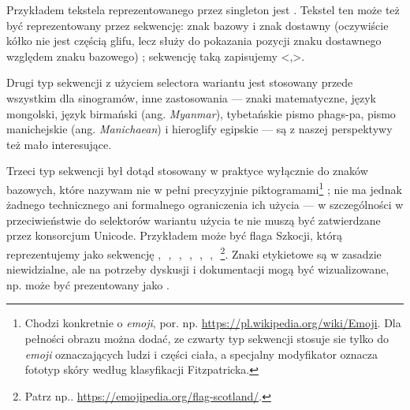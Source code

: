   
  Przykładem tekstela reprezentowanego przez singleton jest 
   . Tekstel ten
  może też być reprezentowany przez sekwencję: znak bazowy 
    i znak dostawny 
  (oczywiście kółko nie jest częścią glifu, lecz służy do pokazania pozycji znaku
  dostawnego względem znaku bazowego)  ; sekwencję taką zapisujemy
  <,>.

  Drugi typ sekwencji z użyciem selectora wariantu jest stosowany
  przede wszystkim dla sinogramów, inne zastosowania --- znaki
  matematyczne, język mongolski, język birmański
  (ang. \textit{Myanmar}), tybetańskie pismo phags-pa, pismo
  manichejskie (ang. \textit{Manichaean}) i hieroglify egipskie --- są
  z naszej perspektywy też mało interesujące.

  Trzeci typ sekwencji był dotąd stosowany w praktyce wyłącznie do
  znaków bazowych, które nazywam nie w pełni precyzyjnie
  piktogramami\footnote{Chodzi konkretnie o \textit{emoji},
    por. np. \url{https://pl.wikipedia.org/wiki/Emoji}. Dla pełności
    obrazu można dodać, ze czwarty typ sekwencji stosuje sie tylko do
    \textit{emoji} oznaczających ludzi i części ciała, a specjalny
    modyfikator oznacza fototyp skóry według klasyfikacji
    Fitzpatricka.}
; nie ma jednak żadnego technicznego ani formalnego
  ograniczenia ich użycia --- w szczególności w przeciwieństwie do
  selektorów wariantu użycia te nie muszą być zatwierdzane przez
  konsorcjum Unicode. Przykładem może być flaga Szkocji, którą
  reprezentujemy jako sekwencję , 󠁧 , 󠁢 , 󠁳 , 󠁣 , 󠁴
  , 󠁿 \footnote{Patrz
    np.. \url{https://emojipedia.org/flag-scotland/}.}. Znaki
  etykietowe są w zasadzie niewidzialne, ale na potrzeby dyskusji i
  dokumentacji mogą być wizualizowane, np.   może być prezentowany jako {}.


